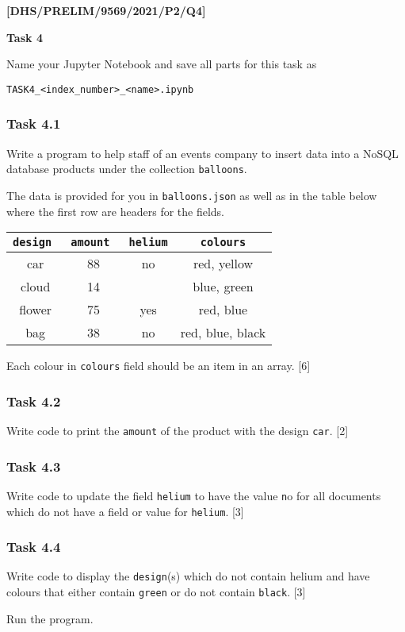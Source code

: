 \item \textbf{{[}DHS/PRELIM/9569/2021/P2/Q4{]} }

\textbf{Task 4}

Name your Jupyter Notebook and save all parts for this task as 

\texttt{TASK4\_<index\_number>\_<name>.ipynb }

\subsubsection*{Task 4.1 }

Write a program to help staff of an events company to insert data
into a NoSQL database products under the collection \texttt{balloons}. 

The data is provided for you in \texttt{balloons.json} as well as
in the table below where the first row are headers for the fields. 
\noindent \begin{center}
\begin{tabular}{|c|c|c|c|}
\hline 
\texttt{design } & \texttt{amount } & \texttt{helium} & \texttt{colours}\tabularnewline
\hline 
car  & 88  & no & red, yellow\tabularnewline
\hline 
cloud  & 14  &  & blue, green\tabularnewline
\hline 
flower  & 75  & yes & red, blue\tabularnewline
\hline 
bag  & 38  & no  & red, blue, black\tabularnewline
\hline 
\end{tabular}
\par\end{center}

Each colour in \texttt{colours} field should be an item in an array.
\hfill{}{[}6{]}

\subsubsection*{Task 4.2 }

Write code to print the \texttt{amount} of the product with the design
\textquotedbl\texttt{car}\textquotedbl .\hfill{} {[}2{]}

\subsubsection*{Task 4.3 }

Write code to update the field \texttt{helium} to have the value \textquotedbl\texttt{n}o\textquotedbl{}
for all documents which do not have a field or value for \texttt{helium}.
\hfill{}{[}3{]}

\subsubsection*{Task 4.4 }

Write code to display the \texttt{design}(s) which do not contain
helium and have colours that either contain \texttt{green} or do not
contain \texttt{black}. \hfill{}{[}3{]}

Run the program.